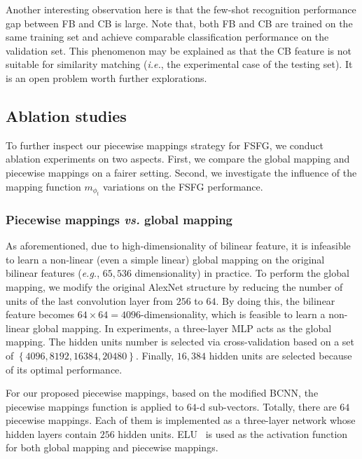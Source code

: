 \documentclass[10pt,twocolumn,letterpaper]{article}
\begin{document}
Another interesting observation here is that the few-shot recognition performance gap between FB and CB is large. Note that, both FB and CB are trained on the same training set and achieve comparable classification performance on the validation set. This phenomenon may be explained as that the CB feature is not suitable for similarity matching (\emph{i.e.}, the experimental case of the testing set). It is an open problem worth further explorations.


\subsection{Ablation studies}

To further inspect our piecewise mappings strategy for FSFG, we conduct ablation experiments on two aspects. First, we compare the global mapping and piecewise mappings on a fairer setting. Second, we investigate the influence of the mapping function $m_{\phi_{t}}$ variations on the FSFG performance.

\subsubsection{Piecewise mappings \emph{vs.} global mapping}\label{sec:PMvsGM}

As aforementioned, due to high-dimensionality of bilinear feature, it is infeasible to learn a non-linear (even a simple linear) global mapping on the original bilinear features (\emph{e.g.}, $65,536$ dimensionality) in practice. To perform the global mapping,
we modify the original AlexNet structure by reducing the number of units of the last convolution layer from $256$ to $64$. By doing this, the bilinear feature becomes $64\times 64=4096$-dimensionality, which is feasible to learn a non-linear global mapping. In experiments, a three-layer MLP acts as the global mapping. The hidden units number is selected via cross-validation based on a set of $\left\{4096, 8192, 16384, 20480\right\}$. Finally, $16,384$ hidden units are selected because of its optimal performance.

For our proposed piecewise mappings, based on the modified BCNN, the piecewise mappings function is applied to $64$-d sub-vectors. Totally, there are $64$ piecewise mappings. Each of them is implemented as a three-layer network whose hidden layers contain $256$ hidden units. ELU~\cite{elu} is used as the activation function for both global mapping and piecewise mappings.
\end{document}
